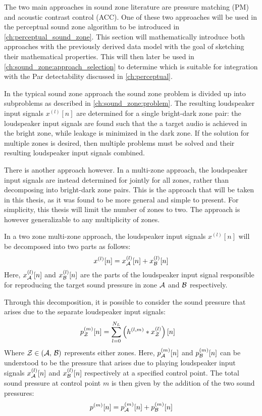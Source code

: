 The two main approaches in sound zone literature are pressure matching (PM) and acoustic contrast control (ACC).
One of these two approaches will be used in the perceptual sound zone algorithm to be introduced in \autoref{ch:perceptual_sound_zone}.
This section will mathematically introduce both approaches with the previously derived data model with the goal of sketching their mathematical properties.
This will then later be used in \autoref{ch:sound_zone:approach_selection} to determine  which is suitable for integration with the 
Par detectability discussed in \autoref{ch:perceptual}.

In the typical sound zone approach the sound zone problem is divided up into subproblems as described in \autoref{ch:sound_zone:problem}.
The resulting loudspeaker input signals $x^{(l)}[n]$ are determined for a single bright-dark zone pair:
the loudspeaker input signals are found such that the a target audio is achieved in the bright zone, while leakage is minimized in the dark zone.
If the solution for multiple zones is desired, then multiple problems must be solved and their resulting loudspeaker input signals combined.

There is another approach however.
In a multi-zone approach, the loudspeaker input signals are instead determined for jointly for all zones, rather than decomposing into bright-dark zone pairs.
This is the approach that will be taken in this thesis, as it was found to be more general and simple to present.
For simplicity, this thesis will limit the number of zones to two.
The approach is however generalizable to any multiplicity of zones.

In a two zone multi-zone approach, the loudspeaker input signals $x^{(l)}[n]$ will be decomposed into two parts as follows:
\begin{equation}
    x^{(l)}[n] = x_{\mathcal{A}}^{(l)}[n] + x_{\mathcal{B}}^{(l)}[n]
\end{equation}
Here, $x_{\mathcal{A}}^{(l)}[n]$ and $x_{\mathcal{B}}^{(l)}[n]$ are the parts of the loudspeaker input signal responsible for reproducing the target sound pressure 
in zone $\mathcal{A}$ and $\mathcal{B}$ respectively.

Through this decomposition, it is possible to consider the sound pressure that arises due to the separate loudspeaker input signals:
\begin{align}
    p_{\mathcal{Z}}^{(m)}[n] &= \sum_{l=0}^{N_L} \left(h^{(l,m)} \ast x_{\mathcal{Z}}^{(l)}\right)[n] 
\end{align}
\label{eq:sound_zone:approaches:pressure}
Where $\mathcal{Z} \in \left(\mathcal{A},\,\mathcal{B}\right)$ represents either zones.
Here, $p_{\mathcal{A}}^{(m)}[n]$ and $p_{\mathcal{B}}^{(m)}[n]$ can be understood to be the pressure that arises due to 
playing loudspeaker input signals $x_{\mathcal{A}}^{(l)}[n]$ and $x_{\mathcal{B}}^{(l)}[n]$ respectively at a specified control point. 
The total sound pressure at control point $m$ is then given by the addition of the two sound pressures:
\begin{equation}
    p^{(m)}[n] = p_{\mathcal{A}}^{(m)}[n] + p_{\mathcal{B}}^{(m)}[n]
\end{equation}

